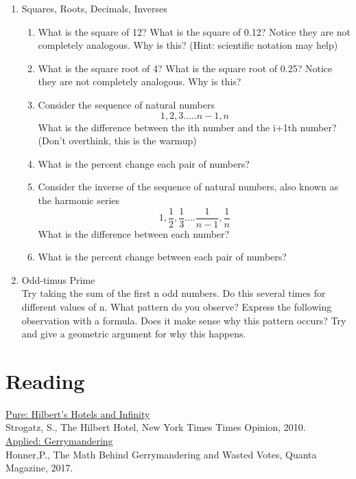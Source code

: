 \documentclass{article}
\begin{document}
\begin{enumerate}
    \item Squares, Roots, Decimals, Inverses
    \begin{enumerate}
        \item What is the square of 12? What is the square of 0.12? Notice they are not completely analogous. Why is this? (Hint: scientific notation may help)
        \item What is the square root of 4? What is the square root of 0.25? Notice they are not completely analogous. Why is this?
        \item Consider the sequence of natural numbers
        \[ 1,2,3.....n-1,n\]
        What is the difference between the ith number and the i+1th number? (Don't overthink, this is the warmup)
        \item What is the percent change each pair of numbers? 
        \item Consider the inverse of the sequence of natural numbers, also known as the harmonic series
        \[ 1,\frac{1}{2},\frac{1}{3}....\frac{1}{n-1},\frac{1}{n}\]
        What is the difference between each number?
        \item What is the percent change between each pair of numbers?
    \end{enumerate}
    \item Odd-timus Prime\\
    Try taking the sum of the first n odd numbers. Do this several times for different values of n. What pattern do you observe? Express the following observation with a formula. Does it make sense why this pattern occurs? Try and give a geometric argument for why this happens.

\end{enumerate}
\section{Reading}

\href{https://opinionator.blogs.nytimes.com/2010/05/09/the-hilbert-hotel/}{Pure: Hilbert's Hotels and Infinity}\\
Strogatz, S., The Hilbert Hotel, New York Times Times Opinion, 2010.\\

\href{https://www.quantamagazine.org/the-math-behind-gerrymandering-and-wasted-votes-20171012/}{Applied: Gerrymandering}\\
Honner,P., The Math Behind Gerrymandering and Wasted Votes, Quanta Magazine, 2017.\\
\end{document}
